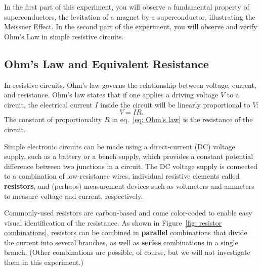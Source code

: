 \documentclass[addpoints]{physlabs}
\begin{document}
\begin{labsection}

\begin{objective}
    In the first part of this experiment, you will observe a fundamental property of superconductors, the levitation of a magnet by a superconductor, illustrating the Meissner Effect. In the second part of the experiment, you will observe and verify Ohm’s Law in simple resistive circuits.
\end{objective}

\begin{theory}

\subsection*{Ohm's Law and Equivalent Resistance}

In resistive circuits, Ohm's law governs the relationship between voltage, current, and resistance. Ohm's law states that if one applies a driving voltage $V$ to a circuit, the electrical current $I$ inside the circuit will be linearly proportional to $V$:
%
\begin{equation}\label{eq: Ohm's law}
    V = IR.
\end{equation}
%
The constant of proportionality $R$ in eq.~\ref{eq: Ohm's law} is the resistance of the circuit.

Simple electronic circuits can be made using a direct-current (DC) voltage supply, such as a battery or a bench supply, which provides a constant potential difference between two junctions in a circuit. The DC voltage supply is connected to a combination of low-resistance wires, individual resistive elements called \textbf{resistors}, and (perhaps) measurement devices such as voltmeters and ammeters to measure voltage and current, respectively.

Commonly-used resistors are carbon-based and come color-coded to enable easy visual identification of the resistance. As shown in Figure~\ref{fig: resistor combinations}, resistors can be combined in \textbf{parallel} combinations that divide the current into several branches, as well as \textbf{series} combinations in a single branch. (Other combinations are possible, of course, but we will not investigate them in this experiment.)


\end{theory}
\end{labsection}
\end{document}
